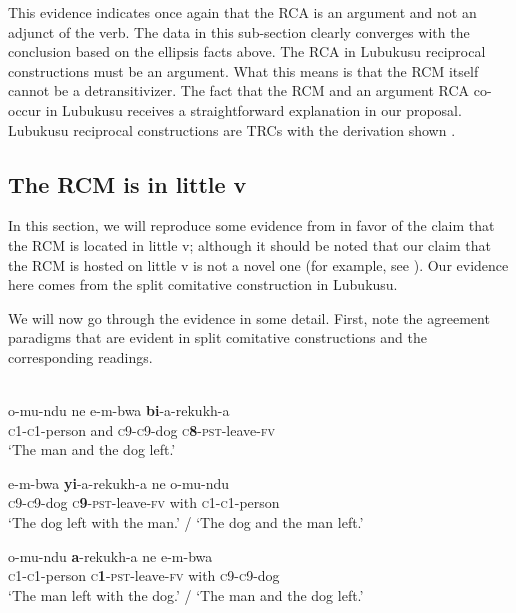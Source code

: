 \documentclass[output=paper]{langsci/langscibook}
\begin{document}
This evidence indicates once again that the RCA is an argument and not an adjunct of the verb. The data in this sub-section clearly converges with the conclusion based on the ellipsis facts above. The RCA in Lubukusu reciprocal constructions must be an argument. What this means is that the RCM itself cannot be a detransitivizer. The fact that the RCM and an argument RCA co-occur in Lubukusu receives a straightforward explanation in our proposal. Lubukusu reciprocal constructions are TRCs with the derivation shown . 

 
\subsection{The RCM is in little v}


In this section, we will reproduce some evidence from \citet{BakerEtAl2013} in favor of the claim that the RCM is located in little v; although it should be noted that our claim that the RCM is hosted on little v is not a novel one (for example, see \citealt{Bruening2006}). Our evidence here comes from the split comitative construction in Lubukusu. 

We will now go through the evidence in some detail. First, note the agreement paradigms that are evident in split comitative constructions and the corresponding readings. 


\ea\label{ex:safir:20}
\\
\ea\label{ex:safir:20a}
\gll   o-mu-ndu        ne   e-m-bwa  \textbf{{bi}}{-a-rekukh-a} \\
       \textsc{c1-c1}-person   and  \textsc{c9-c9}-dog   \textsc{c}\textbf{8}-\textsc{pst}-leave-\textsc{fv} \\
\glt   ‘The man and the dog left.’

\ex\label{ex:safir:20b}
\gll   e-m-bwa  \textbf{{yi}}-a-rekukh-a     ne   o-mu-ndu\\
       \textsc{c9-c9}-dog  \textsc{c}\textbf{9}-\textsc{pst}-leave-\textsc{fv}   with   \textsc{c1-c1}-person\\
\glt   ‘The dog left with the man.’ / ‘The dog and the man left.’

\ex\label{ex:safir:20c}
\gll   o-mu-ndu   \textbf{a}-rekukh-a     ne   e-m-bwa\\
       \textsc{c1-c1}-person   \textsc{c}\textbf{1}-\textsc{pst}-leave-\textsc{fv}   with   \textsc{c9-c9}-dog\\
\glt   ‘The man left with the dog.’ / ‘The man and the dog left.’
\z
\z
\end{document}
